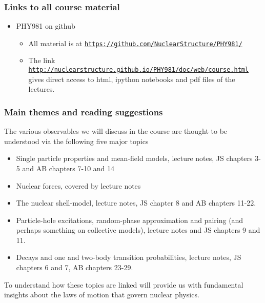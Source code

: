 \documentclass{beamer}
\begin{document}
\begin{frame}
\frametitle{Links to all course material}

\begin{block}{}
\begin{itemize}
\item PHY981 on github
\begin{itemize}

 \item All material is at  \href{{https://github.com/NuclearStructure/PHY981/}}{\nolinkurl{https://github.com/NuclearStructure/PHY981/}}

 \item The link \href{{http://nuclearstructure.github.io/PHY981/doc/web/course.html}}{\nolinkurl{http://nuclearstructure.github.io/PHY981/doc/web/course.html}} gives direct access to html, ipython notebooks and pdf files of the lectures.
\end{itemize}

\noindent
\end{itemize}

\noindent
\end{block}
\end{frame}

\begin{frame}
\frametitle{Main themes and reading suggestions}

\begin{block}{}
The various observables we will discuss in the course are thought to be understood via the following five 
major topics
\begin{itemize}
\item Single  particle properties and mean-field models, lecture notes, JS chapters 3-5 and AB chapters 7-10 and 14

\item Nuclear forces, covered by lecture notes

\item The nuclear shell-model, lecture notes, JS chapter 8 and AB chapters 11-22.

\item Particle-hole excitations, random-phase approximation and pairing (and perhaps something on collective models), lecture notes and JS chapters 9 and 11.

\item Decays and one and two-body transition probabilities, lecture notes, JS chapters 6 and 7, AB chapters 23-29.
\end{itemize}

\noindent
To understand how these topics are linked will provide us with fundamental insights about the laws of motion that govern nuclear physics.
\end{block}
\end{frame}
\end{document}
